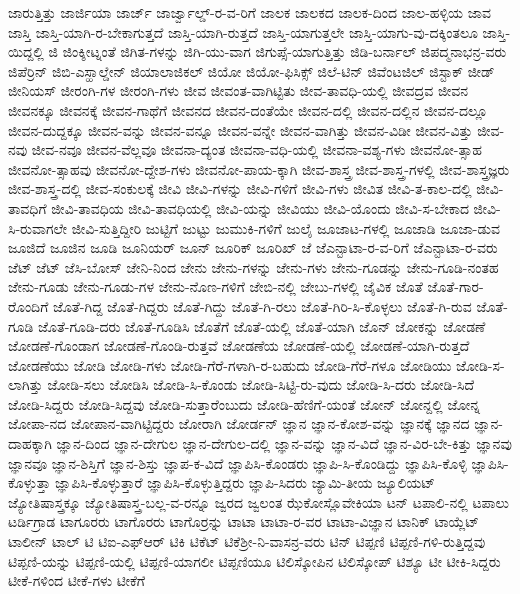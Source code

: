 {ಜಾರುತ್ತಿತ್ತು
ಜಾರ್ಜಿಯಾ
ಜಾರ್ಜ್
ಜಾರ್ಜ್ವಾಲ್ಡ್-ರ-ವ-ರಿಗೆ
ಜಾಲಕ
ಜಾಲಕದ
ಜಾಲಕ-ದಿಂದ
ಜಾಲ-ಹಳ್ಳಿಯ
ಜಾವ
ಜಾಸ್ತಿ
ಜಾಸ್ತಿ-ಯಾಗಿ-ರ-ಬೇಕಾಗುತ್ತದೆ
ಜಾಸ್ತಿ-ಯಾಗಿ-ರುತ್ತದೆ
ಜಾಸ್ತಿ-ಯಾಗುತ್ತಲೇ
ಜಾಸ್ತಿ-ಯಾಗು-ವು-ದಕ್ಕಿಂತಲೂ
ಜಾಸ್ತಿ-ಯಿದ್ದಲ್ಲಿ
ಜಿ
ಜಿಂಕ್ಶೀಟ್ನಂತೆ
ಜಿಗಿತ-ಗಳನ್ನು
ಜಿಗಿ-ಯು-ವಾಗ
ಜಿಗುಪ್ಸೆ-ಯಾಗುತ್ತಿತ್ತು
ಜಿಡಿ-ಬರ್ನಾಲ್
ಜಿಪದ್ಮನಾಭನ್ರ-ವರು
ಜಿಪೆರ್ರಿನ್
ಜಿಬಿ-ಎಸ್ಹಾಲ್ಡೇನ್
ಜಿಯಾಲಾಜಿಕಲ್
ಜಿಯೋ
ಜಿಯೋ-ಫಿಸಿಕ್ಸ್
ಜಿಲೆ-ಟಿನ್
ಜಿವೆಂಟಜಿಲ್
ಜಿಸ್ಟಾಕ್
ಜೀಡ್
ಜೀನಿಯಸ್
ಜೀರಂಗಿ-ಗಳ
ಜೀರಂಗಿ-ಗಳು
ಜೀವ
ಜೀವಂತ-ವಾಗಿಟ್ಟಿತು
ಜೀವ-ತಾವಧಿ-ಯಲ್ಲಿ
ಜೀವದ್ರವ
ಜೀವನ
ಜೀವನಕ್ಕೂ
ಜೀವನಕ್ಕೆ
ಜೀವನ-ಗಾಥೆಗೆ
ಜೀವನದ
ಜೀವನ-ದಂತೆಯೇ
ಜೀವನ-ದಲ್ಲಿ
ಜೀವನ-ದಲ್ಲಿನ
ಜೀವನ-ದಲ್ಲೂ
ಜೀವನ-ದುದ್ದಕ್ಕೂ
ಜೀವನ-ವನ್ನು
ಜೀವನ-ವನ್ನೂ
ಜೀವನ-ವನ್ನೇ
ಜೀವನ-ವಾಗಿತ್ತು
ಜೀವನ-ವಿಡೀ
ಜೀವನ-ವಿತ್ತು
ಜೀವ-ನವು
ಜೀವ-ನವೂ
ಜೀವನ-ವೆಲ್ಲವೂ
ಜೀವನಾ-ದ್ಯಂತ
ಜೀವನಾ-ವಧಿ-ಯಲ್ಲಿ
ಜೀವನಾ-ವಶ್ಯ-ಗಳು
ಜೀವನೋ-ತ್ಸಾಹ
ಜೀವನೋ-ತ್ಸಾಹವು
ಜೀವನೋ-ದ್ದೇಶ-ಗಳು
ಜೀವನೋ-ಪಾಯ-ಕ್ಕಾಗಿ
ಜೀವ-ಶಾಸ್ತ್ರ
ಜೀವ-ಶಾಸ್ತ್ರ-ಗಳಲ್ಲಿ
ಜೀವ-ಶಾಸ್ತ್ರಜ್ಞರು
ಜೀವ-ಶಾಸ್ತ್ರ-ದಲ್ಲಿ
ಜೀವ-ಸಂಕುಲಕ್ಕೆ
ಜೀವಿ
ಜೀವಿ-ಗಳನ್ನು
ಜೀವಿ-ಗಳಿಗೆ
ಜೀವಿ-ಗಳು
ಜೀವಿತ
ಜೀವಿ-ತ-ಕಾಲ-ದಲ್ಲಿ
ಜೀವಿ-ತಾವಧಿಗೆ
ಜೀವಿ-ತಾವಧಿಯ
ಜೀವಿ-ತಾವಧಿಯಲ್ಲಿ
ಜೀವಿ-ಯನ್ನು
ಜೀವಿಯು
ಜೀವಿ-ಯೊಂದು
ಜೀವಿ-ಸ-ಬೇಕಾದ
ಜೀವಿ-ಸಿ-ರುವಾಗಲೇ
ಜೀವಿ-ಸುತ್ತಿದ್ದೀರಿ
ಜುಟ್ಟಿಗೆ
ಜುಟ್ಟು
ಜುಮುಕಿ-ಗಳಿಗೆ
ಜುಲೈ
ಜೂಜಾಟ-ಗಳಲ್ಲಿ
ಜೂಜಾಡಿ
ಜೂಜಾ-ಡುವ
ಜೂಜಿದೆ
ಜೂಜಿನ
ಜೂಡಿ
ಜೂನಿಯರ್
ಜೂನ್
ಜೂರಿಕ್
ಜೂರಿಖ್
ಜೆ
ಜೆಎನ್ಟಾಟಾ-ರ-ವ-ರಿಗೆ
ಜೆಎನ್ಟಾಟಾ-ರ-ವರು
ಜೆಟ್
ಜೆಟ್
ಜೆಸಿ-ಬೋಸ್
ಜೇನಿ-ನಿಂದ
ಜೇನು
ಜೇನು-ಗಳನ್ನು
ಜೇನು-ಗಳು
ಜೇನು-ಗೂಡನ್ನು
ಜೇನು-ಗೂಡಿ-ನಂತಹ
ಜೇನು-ಗೂಡು
ಜೇನು-ಗೂಡು-ಗಳ
ಜೇನು-ನೊಣ-ಗಳಿಗೆ
ಜೇಬಿ-ನಲ್ಲಿ
ಜೇಬು-ಗಳಲ್ಲಿ
ಜೈವಿಕ
ಜೊತೆ
ಜೊತೆ-ಗಾರ-ರೊಂದಿಗೆ
ಜೊತೆ-ಗಿದ್ದ
ಜೊತೆ-ಗಿದ್ದರು
ಜೊತೆ-ಗಿದ್ದು
ಜೊತೆ-ಗಿ-ರಲು
ಜೊತೆ-ಗಿರಿ-ಸಿ-ಕೊಳ್ಳಲು
ಜೊತೆ-ಗಿ-ರುವ
ಜೊತೆ-ಗೂಡಿ
ಜೊತೆ-ಗೂಡಿ-ದರು
ಜೊತೆ-ಗೂಡಿಸಿ
ಜೊತೆಗೆ
ಜೊತೆ-ಯಲ್ಲಿ
ಜೊತೆ-ಯಾಗಿ
ಜೊನ್
ಜೋಕನ್ನು
ಜೋಡಣೆ
ಜೋಡಣೆ-ಗೊಂಡಾಗ
ಜೋಡಣೆ-ಗೊಂಡಿ-ರುತ್ತವೆ
ಜೋಡಣೆಯ
ಜೋಡಣೆ-ಯಲ್ಲಿ
ಜೋಡಣೆ-ಯಾಗಿ-ರುತ್ತದೆ
ಜೋಡಣೆಯು
ಜೋಡಿ
ಜೋಡಿ-ಗಳು
ಜೋಡಿ-ಗೆರೆ-ಗಳಾಗಿ-ರ-ಬಹುದು
ಜೋಡಿ-ಗೆರೆ-ಗಳೂ
ಜೋಡಿಯು
ಜೋಡಿ-ಸ-ಲಾಗಿತ್ತು
ಜೋಡಿ-ಸಲು
ಜೋಡಿಸಿ
ಜೋಡಿ-ಸಿ-ಕೊಂಡು
ಜೋಡಿ-ಸಿಟ್ಟಿ-ರು-ವುದು
ಜೋಡಿ-ಸಿ-ದರು
ಜೋಡಿ-ಸಿದೆ
ಜೋಡಿ-ಸಿದ್ದರು
ಜೋಡಿ-ಸಿದ್ದವು
ಜೋಡಿ-ಸುತ್ತಾರೆಂಬುದು
ಜೋಡಿ-ಹೆಣಿಗೆ-ಯಂತೆ
ಜೋನ್
ಜೋನ್ದಲ್ಲಿ
ಜೋನ್ನ
ಜೋಪಾ-ನದ
ಜೋಪಾನ-ವಾಗಿಟ್ಟಿದ್ದರು
ಜೋರಾಗಿ
ಜೋರ್ಡನ್
ಜ್ಞಾನ
ಜ್ಞಾನ-ಕೋಶ-ವನ್ನು
ಜ್ಞಾನಕ್ಕೆ
ಜ್ಞಾನದ
ಜ್ಞಾನ-ದಾಹಕ್ಕಾಗಿ
ಜ್ಞಾನ-ದಿಂದ
ಜ್ಞಾನ-ದೇಗುಲ
ಜ್ಞಾನ-ದೇಗುಲ-ದಲ್ಲಿ
ಜ್ಞಾನ-ವನ್ನು
ಜ್ಞಾನ-ವಿದೆ
ಜ್ಞಾನ-ವಿರ-ಬೇ-ಕಿತ್ತು
ಜ್ಞಾನವು
ಜ್ಞಾನವೂ
ಜ್ಞಾನ-ಶಿಸ್ತಿಗೆ
ಜ್ಞಾನ-ಶಿಸ್ತು
ಜ್ಞಾಪ-ಕ-ವಿದೆ
ಜ್ಞಾಪಿಸಿ-ಕೊಂಡರು
ಜ್ಞಾಪಿ-ಸಿ-ಕೊಂಡಿದ್ದು
ಜ್ಞಾಪಿಸಿ-ಕೊಳ್ಳಿ
ಜ್ಞಾಪಿಸಿ-ಕೊಳ್ಳುತ್ತಾ
ಜ್ಞಾಪಿಸಿ-ಕೊಳ್ಳುತ್ತಾರೆ
ಜ್ಞಾಪಿಸಿ-ಕೊಳ್ಳುತ್ತಿದ್ದರು
ಜ್ಞಾಪಿ-ಸಿದರು
ಜ್ಯಾಮಿ-ತೀಯ
ಜ್ಯೂಲಿಯಟ್
ಜ್ಯೋತಿಷಾಸ್ತ್ರಕ್ಕೂ
ಜ್ಯೋತಿಷಾಸ್ತ್ರ-ಬಲ್ಲ-ವ-ರನ್ನೂ
ಜ್ವರದ
ಜ್ವಲಂತ
ಝೆಕೋಸ್ಲೊವೇಕಿಯಾ
ಟನ್
ಟಪಾಲಿ-ನಲ್ಲಿ
ಟಪಾಲು
ಟರ್ಡಿಗ್ರಾಡ
ಟಾಗೂರರು
ಟಾಗೊರರು
ಟಾಗೊರ್ರನ್ನು
ಟಾಟಾ
ಟಾಟಾ-ರ-ವರ
ಟಾಟಾ-ವಿಜ್ಞಾನ
ಟಾನಿಕ್
ಟಾಯ್ಲೆಟ್
ಟಾಲೀನ್
ಟಾಲ್
ಟಿ
ಟಿಐ-ಎಫ್ಆರ್
ಟಿಕಿ
ಟಿಕೆಟ್
ಟಿಕೆಶ್ರೀ-ನಿ-ವಾಸನ್ರ-ವರು
ಟಿನ್
ಟಿಪ್ಪಣಿ
ಟಿಪ್ಪಣಿ-ಗಳಿ-ರುತ್ತಿದ್ದವು
ಟಿಪ್ಪಣಿ-ಯನ್ನು
ಟಿಪ್ಪಣಿ-ಯಲ್ಲಿ
ಟಿಪ್ಪಣಿ-ಯಾಗಲೀ
ಟಿಪ್ಪಣಿಯೂ
ಟಿಲಿಸ್ಕೋಪಿನ
ಟಿಲಿಸ್ಕೋಪ್
ಟಿಶ್ಯೂ
ಟೀ
ಟೀಕಿ-ಸಿದ್ದರು
ಟೀಕೆ-ಗಳಿಂದ
ಟೀಕೆ-ಗಳು
ಟೀಕೆಗೆ
}
